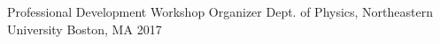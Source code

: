 \begin{cvhonors}








    


    
  \cvhonor
    {Professional Development Workshop Organizer} %
    {Dept. of Physics, Northeastern University} %
    {Boston, MA} %
    {2017} %

     

\end{cvhonors}
